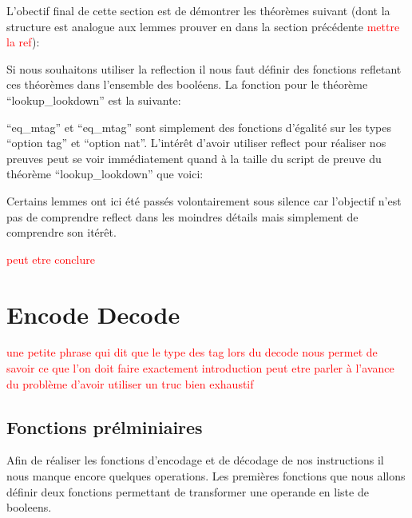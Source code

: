 \documentclass {article}
\newcommand{\codefrom}[3]
           {}
\theoremstyle{definition}
\theoremstyle{remark}
\newcommand{\todo}[1]{\textcolor{red}{#1}}
\begin{document}
L'obectif final de cette section est de démontrer les théorèmes suivant (dont la structure est analogue aux lemmes prouver
en dans la section précédente \todo{mettre la ref}):

\codefrom{src}{association_list}{lookup_lookdown}
\codefrom{src}{association_list}{lookdown_lookup}


Si nous souhaitons utiliser la reflection il nous faut définir des fonctions refletant
ces théorèmes dans l'ensemble des booléens. La fonction pour le théorème ``lookup\_lookdown''
est la suivante:

\codefrom{src}{association_list}{lookup_encdec}
``eq\_mtag'' et ``eq\_mtag'' sont simplement des fonctions d'égalité sur les types ``option tag'' et ``option nat''.
L'intérêt d'avoir utiliser reflect pour réaliser nos preuves peut se voir immédiatement quand à la taille
du script de preuve du théorème ``lookup\_lookdown'' que voici:

\codefrom{src}{association_list}{lookup_lookdown}

\codefrom{src}{association_list}{lookup_lookdown_script}

Certains lemmes ont ici été passés volontairement sous silence car l'objectif n'est pas
de comprendre reflect dans les moindres détails mais simplement de comprendre son itérêt.

\todo{peut etre conclure}


\section{Encode Decode}
\label{Encode Decode}

\todo{une petite phrase qui dit que le type des tag lors du decode nous permet de savoir ce que l'on doit faire exactement}
\todo{introduction peut etre parler à l'avance du problème d'avoir utiliser un truc bien exhaustif}



\subsection{Fonctions prélminiaires}

Afin de réaliser les fonctions d'encodage et de décodage de nos instructions il nous manque encore quelques operations.
Les premières fonctions que nous allons définir deux fonctions permettant de transformer une operande en liste de booleens.
\end{document}
